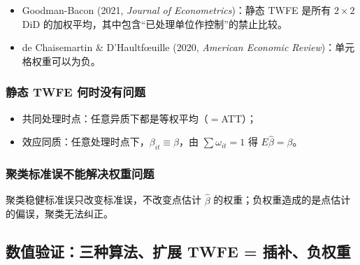 \begin{itemize}
  \item Goodman-Bacon (2021, \textit{Journal of Econometrics})：静态 TWFE 是所有 $2\times2$ DiD 的加权平均，其中包含“已处理单位作控制”的禁止比较。
  \item de Chaisemartin \& D'Haultf\oe uille (2020, \textit{American Economic Review})：单元格权重可以为负。
\end{itemize}

\subsubsection{静态 TWFE 何时没有问题}

\begin{itemize}
  \item 共同处理时点：任意异质下都是等权平均（$=$ATT）；
  \item 效应同质：任意处理时点下，$\beta_{it}\equiv\beta$，由 $\sum\omega_{it}=1$ 得 $E\hat\beta=\beta$。
\end{itemize}

\subsubsection{聚类标准误不能解决权重问题}

聚类稳健标准误只改变标准误，不改变点估计 $\hat\beta$ 的权重；负权重造成的是点估计的偏误，聚类无法纠正。

\subsection{数值验证：三种算法、扩展 TWFE = 插补、负权重}

